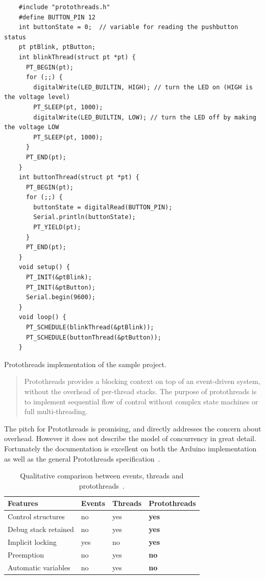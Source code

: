 \begin{listing}[htb!]
  \centering
  \begin{verbatim}
    #include "protothreads.h"
    #define BUTTON_PIN 12
    int buttonState = 0;  // variable for reading the pushbutton status
    pt ptBlink, ptButton;
    int blinkThread(struct pt *pt) {
      PT_BEGIN(pt);
      for (;;) {
        digitalWrite(LED_BUILTIN, HIGH); // turn the LED on (HIGH is the voltage level)
        PT_SLEEP(pt, 1000);
        digitalWrite(LED_BUILTIN, LOW); // turn the LED off by making the voltage LOW
        PT_SLEEP(pt, 1000);
      }
      PT_END(pt);
    }
    int buttonThread(struct pt *pt) {
      PT_BEGIN(pt);
      for (;;) {
        buttonState = digitalRead(BUTTON_PIN);
        Serial.println(buttonState);
        PT_YIELD(pt);
      }
      PT_END(pt);
    }
    void setup() {
      PT_INIT(&ptBlink);
      PT_INIT(&ptButton);
      Serial.begin(9600);
    }
    void loop() {
      PT_SCHEDULE(blinkThread(&ptBlink));
      PT_SCHEDULE(buttonThread(&ptButton));
    }
  \end{verbatim}
  \caption{Protothreads implementation of the sample project.}
  \label{lst:protothreadsexample}
\end{listing}


\blockcquote{Artin2020, AdamDunkelProtothreads}{Protothreads provides a blocking context on top of an event-driven system, without the overhead of per-thread stacks. The purpose of protothreads is to implement sequential flow of control without complex state machines or full multi-threading.}

The pitch for Protothreads is promising, and directly addresses the concern about overhead. However it does not describe the model of concurrency in great detail. Fortunately the documentation is excellent on both the Arduino implementation~\cite{Artin2020} as well as the general Protothreads specification~\cite{AdamDunkelProtothreads}.


\begin{table}[htb!]
  \centering
  \begin{tabular}{lll>{\bfseries}l}
    \toprule
    Features             & Events & Threads & Protothreads \\ \midrule
    Control structures   & no     & yes     & yes          \\
    Debug stack retained & no     & yes     & yes          \\
    Implicit locking     & yes    & no      & yes          \\
    Preemption           & no     & yes     & no           \\
    Automatic variables  & no     & yes     & no
  \end{tabular}
  \caption{Qualitative comparison between events, threads and protothreads~\cite{dunkels05using}.}
  \label{tab:protothreadscomparison}
\end{table}


